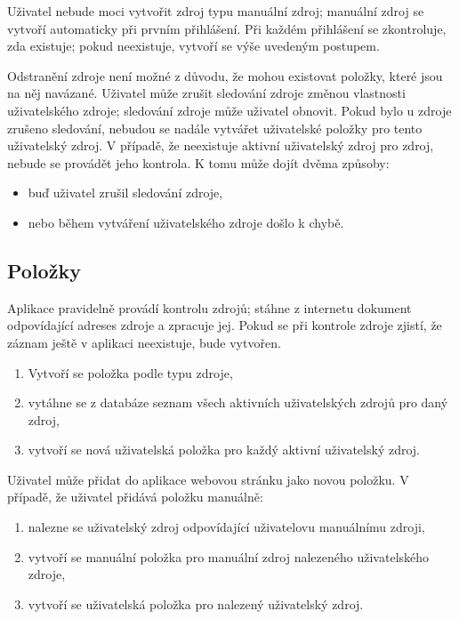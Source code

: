 Uživatel nebude moci vytvořit zdroj typu manuální zdroj; manuální zdroj se vytvoří automaticky při prvním přihlášení.
Při každém přihlášení se zkontroluje, zda existuje; pokud neexistuje, vytvoří se výše uvedeným postupem.

Odstranění zdroje není možné z důvodu, že mohou existovat položky, které jsou na něj navázané.
Uživatel může zrušit sledování zdroje změnou vlastnosti uživatelského zdroje; sledování zdroje může uživatel obnovit.
Pokud bylo u zdroje zrušeno sledování, nebudou se nadále vytvářet uživatelské položky pro tento uživatelský zdroj.
V případě, že neexistuje aktivní uživatelský zdroj pro zdroj, nebude se provádět jeho kontrola.
K tomu může dojít dvěma způsoby:
\begin{itemize}
	\item buď uživatel zrušil sledování zdroje,
	\item nebo během vytváření uživatelského zdroje došlo k chybě.
\end{itemize}

\subsection{Položky}

Aplikace pravidelně provádí kontrolu zdrojů; stáhne z internetu dokument odpovídající adreses zdroje a zpracuje jej.
Pokud se při kontrole zdroje zjistí, že záznam ještě v aplikaci neexistuje, bude vytvořen.
\begin{enumerate}
	\item Vytvoří se položka podle typu zdroje,
	\item vytáhne se z databáze seznam všech aktivních uživatelských zdrojů pro daný zdroj,
	\item vytvoří se nová uživatelská položka pro každý aktivní uživatelský zdroj.
\end{enumerate}

Uživatel může přidat do aplikace webovou stránku jako novou položku.
V případě, že uživatel přidává položku manuálně:
\begin{enumerate}
	\item nalezne se uživatelský zdroj odpovídající uživatelovu manuálnímu zdroji,
	\item vytvoří se manuální položka pro manuální zdroj nalezeného uživatelského zdroje,
	\item vytvoří se uživatelská položka pro nalezený uživatelský zdroj.
\end{enumerate}

